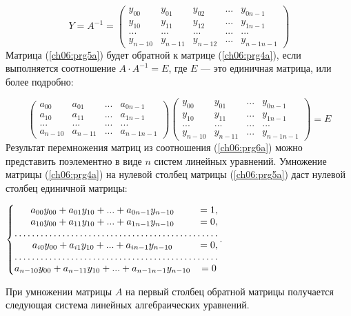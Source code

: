 \begin{equation}\label{ch06:prg5a}
Y=A^{-1}=\left(\begin{matrix}y_{00}&y_{01}&y_{02}&...&y_{0n-1}\\y_{10}&y_{11}&y_{12}&...&y_{1n-1}\\...&...&...&...&...\\y_{n-10}&y_{n-11}&y_{n-12}&...&y_{n-1n-1}\end{matrix}\right)
\end{equation}
Матрица (\ref{ch06:prg5a}) будет обратной к матрице (\ref{ch06:prg4a}), если выполняется соотношение $A\cdot A^{-1}=E$,
где $E$ --- это единичная матрица, или более подробно:

\noindent\begin{equation}\label{ch06:prg6a}
\left(\begin{matrix}a_{00}&a_{01}&...&a_{0n-1}\\a_{10}&a_{11}&...&a_{1n-1}\\...&...&...&...\\a_{n-10}&a_{n-11}&...&a_{n-1n-1}\end{matrix}\right)\left(\begin{matrix}y_{00}&y_{01}&...&y_{0n-1}\\y_{10}&y_{11}&...&y_{1n-1}\\...&...&...&...\\y_{n-10}&y_{n-11}&...&y_{n-1n-1}\end{matrix}\right)=E
\end{equation}
Результат перемножения матриц из соотношения (\ref{ch06:prg6a}) можно представить поэлементно в виде $n$ систем линейных
уравнений. Умножение матрицы (\ref{ch06:prg4a}) на нулевой столбец матрицы (\ref{ch06:prg5a}) даст нулевой столбец
единичной матрицы:

$\left\{\begin{matrix}
a_{00}y_{00}+a_{01}y_{10}+...+a_{0n-1}y_{n-10}&=1,\\
a_{10}y_{00}+a_{11}y_{10}+...+a_{1n-1}y_{n-10}&=0,\\
\hdotsfor{2}\\
a_{i0}y_{00}+a_{i1}y_{10}+...+a_{in-1}y_{n-10}&=0,\\
\hdotsfor{2}\\
a_{n-10}y_{00}+a_{n-11}y_{10}+...+a_{n-1n-1}y_{n-10}&=0
\end{matrix}\right.$.

При умножении матрицы $A$ на первый столбец обратной матрицы получается следующая система линейных алгебраических
уравнений.

